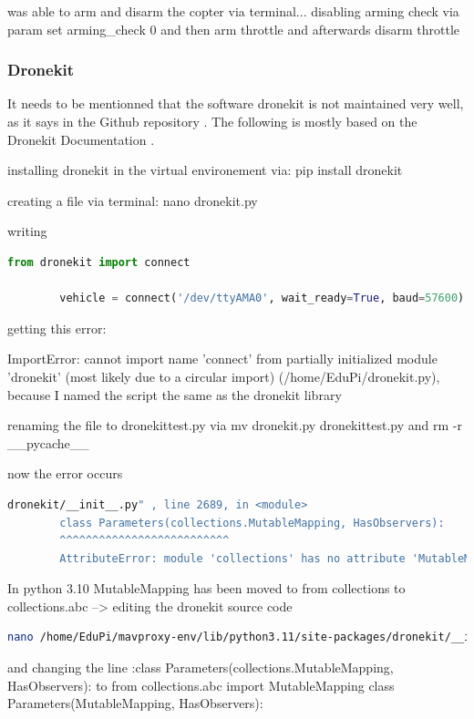 \documentclass{article}
\begin{document}
	was able to arm and disarm the copter via terminal... disabling arming check via param set arming\_check 0 and then arm throttle and afterwards disarm throttle
	
	\subsubsection{Dronekit}
	It needs to be mentionned that the software dronekit is not maintained very well, as it says in the Github repository \cite{dronekitgithub}.
	The following is mostly based on the Dronekit Documentation \cite{dronekitdocs}.
	
	installing dronekit in the virtual environement via: pip install dronekit 
	
	creating a file via terminal: nano dronekit.py
	
	writing 
	\begin{lstlisting}[language=python, caption=Python DroneKit Example, label={lst:dronekit-example}]
		from dronekit import connect
		
		vehicle = connect('/dev/ttyAMA0', wait_ready=True, baud=57600)
	\end{lstlisting}
	
	getting this error:
	
	ImportError: cannot import name 'connect' from partially initialized module 'dronekit' (most likely due to a circular import) (/home/EduPi/dronekit.py), because I named the script the same as the dronekit library
	
	renaming the file to dronekittest.py via
	mv dronekit.py dronekittest.py
	and rm -r \_\_pycache\_\_
	
	now the error occurs
	\begin{lstlisting}[caption= MutableMapping Error, language=bash]
		dronekit/__init__.py" , line 2689, in <module>
		class Parameters(collections.MutableMapping, HasObservers):
		^^^^^^^^^^^^^^^^^^^^^^^^^^
		AttributeError: module 'collections' has no attribute 'MutableMapping'
	\end{lstlisting}
	
	In python 3.10 MutableMapping has been moved to from collections to collections.abc --> editing the dronekit source code 
	
	\begin{lstlisting}[language=bash]
		nano /home/EduPi/mavproxy-env/lib/python3.11/site-packages/dronekit/__init__.py
	\end{lstlisting}
	
	and changing the line :class Parameters(collections.MutableMapping, HasObservers): 
	to 
	from collections.abc import MutableMapping
	class Parameters(MutableMapping, HasObservers):
	
\end{document}
